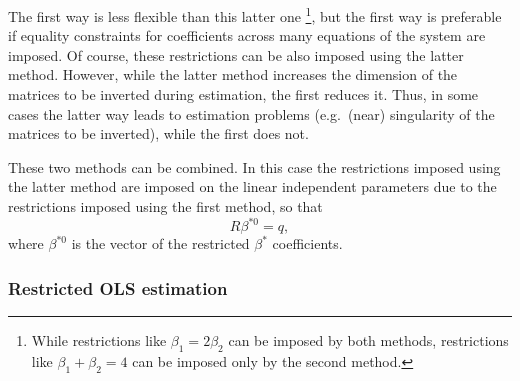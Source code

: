 The first way is less flexible than this latter one%
\footnote{
While restrictions like $\beta_1 = 2 \beta_2$ can be imposed by
both methods,
restrictions like $\beta_1 + \beta_2 = 4$ can be imposed only
by the second method.
}, 
but the first way is preferable if equality constraints for coefficients
across many equations of the system are imposed. 
Of course, these restrictions can be also imposed using
the latter method.
However, while the latter method increases the dimension of the 
matrices to be inverted during estimation, the first reduces it. 
Thus, in some cases the latter way leads to estimation problems
(e.g.\ (near) singularity of the matrices to be inverted),
while the first does not.

These two methods can be combined.
In this case the restrictions imposed using the latter method are
imposed on the linear independent parameters due to the restrictions
imposed using the first method, so that
\begin{equation}
   R \beta^{*0} = q ,
\end{equation}
where $\beta^{*0}$ is the vector of the restricted $\beta^*$ coefficients.

\subsubsection{Restricted OLS estimation}


